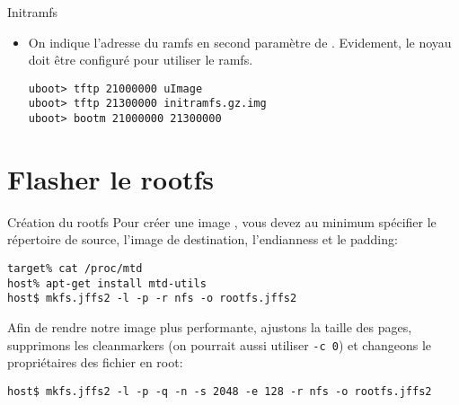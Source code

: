 \begin{frame}[fragile=singleslide]{Initramfs}
  \begin{itemize}
  \item  On  indique  l'adresse   du  ramfs  en  second  paramètre  de
    . Evidement, le noyau doit être configuré pour utiliser
    le ramfs.
    \begin{lstlisting}
uboot> tftp 21000000 uImage
uboot> tftp 21300000 initramfs.gz.img
uboot> bootm 21000000 21300000
    \end{lstlisting}
  \end{itemize}
\end{frame}

\section{Flasher le rootfs}

\begin{frame}[fragile=singleslide]{Création du rootfs}
  Pour créer une image , vous devez au minimum spécifier le
  répertoire  de source,  l'image de  destination, l'endianness  et le
  padding:
  \begin{lstlisting}
target% cat /proc/mtd
host% apt-get install mtd-utils
host$ mkfs.jffs2 -l -p -r nfs -o rootfs.jffs2
  \end{lstlisting}
  Afin de rendre notre image  plus performante, ajustons la taille des
  pages,  supprimons  les  cleanmarkers  (on pourrait  aussi  utiliser
  \verb+-c 0+) et changeons le propriétaires des fichier en root:
  \begin{lstlisting}
host$ mkfs.jffs2 -l -p -q -n -s 2048 -e 128 -r nfs -o rootfs.jffs2
  \end{lstlisting}
\end{frame}

